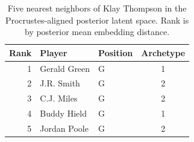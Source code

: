 \begin{table}[htbp]
  \centering\small
  \begin{tabular}{rllc}
    \toprule
    Rank & Player & Position & Archetype \\
    \midrule
    1 & Gerald Green & G & 1 \\
    2 & J.R. Smith & G & 2 \\
    3 & C.J. Miles & G & 2 \\
    4 & Buddy Hield & G & 1 \\
    5 & Jordan Poole & G & 2 \\
    \bottomrule
  \end{tabular}
  \caption{Five nearest neighbors of Klay Thompson in the Procrustes-aligned posterior latent space. Rank is by posterior mean embedding distance.}
  \label{tab:Klay_Thompson_neighbors}
\end{table}

